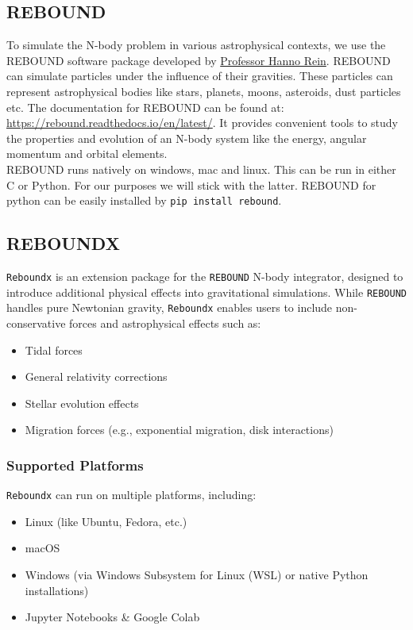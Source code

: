 \documentclass[12pt,a4paper]{article}
\begin{document}
\subsection{REBOUND}
To simulate the N-body problem in various astrophysical contexts, we use the REBOUND software package developed by \href{https://hanno-rein.de/}{ Professor Hanno Rein}. 
REBOUND can simulate particles under the influence of their gravities. These particles can represent astrophysical bodies like stars, planets, moons, asteroids, dust particles etc\cite{rebound}. 
The documentation for REBOUND can be found at: \href{https://rebound.readthedocs.io/en/latest/}{https://rebound.readthedocs.io/en/latest/}. It provides convenient tools to study the properties and evolution of an N-body system
like the energy, angular momentum and orbital elements. 
\\ REBOUND runs natively on windows, mac and linux. This can be run in either C or Python. For our purposes
we will stick with the latter. REBOUND for python can be easily installed by \texttt{pip install rebound}.

\subsection{REBOUNDX}
\texttt{Reboundx} is an extension package for the \texttt{REBOUND} N-body integrator, designed to introduce additional physical effects into gravitational simulations. While \texttt{REBOUND} handles pure Newtonian gravity, \texttt{Reboundx} enables users to include non-conservative forces and astrophysical effects such as:
\begin{itemize}
    \item Tidal forces
    \item General relativity corrections
    \item Stellar evolution effects
    \item Migration forces (e.g., exponential migration, disk interactions)
\end{itemize}
\subsubsection{Supported Platforms}
\texttt{Reboundx} can run on multiple platforms, including:
\begin{itemize}
    \item Linux (like Ubuntu, Fedora, etc.)
    \item macOS
    \item Windows (via Windows Subsystem for Linux (WSL) or native Python installations)
    \item Jupyter Notebooks \& Google Colab
\end{itemize}
\end{document}

